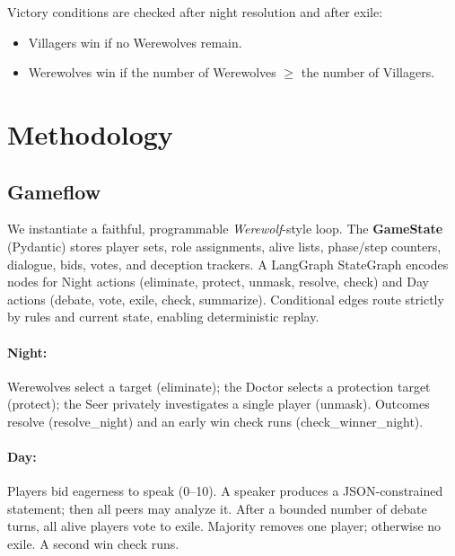 \documentclass[12pt]{article}
\begin{document}
Victory conditions are checked after night resolution and after exile:
\begin{itemize}
  \item Villagers win if no Werewolves remain.
  \item Werewolves win if the number of Werewolves \( \geq \) the number of Villagers.
\end{itemize}

\section{Methodology}

\subsection{Gameflow}
We instantiate a faithful, programmable \textit{Werewolf}-style loop. The \textbf{GameState} (Pydantic) stores player sets, role assignments, alive lists, phase/step counters, dialogue, bids, votes, and deception trackers. A LangGraph StateGraph encodes nodes for Night actions (eliminate, protect, unmask, resolve, check) and Day actions (debate, vote, exile, check, summarize). Conditional edges route strictly by rules and current state, enabling deterministic replay.

\paragraph{Night:} Werewolves select a target (eliminate); the Doctor selects a protection target (protect); the Seer privately investigates a single player (unmask). Outcomes resolve (resolve\_night) and an early win check runs (check\_winner\_night).

\paragraph{Day:} Players bid eagerness to speak (0–10). A speaker produces a JSON-constrained statement; then all peers may analyze it. After a bounded number of debate turns, all alive players vote to exile. Majority removes one player; otherwise no exile. A second win check runs.
\end{document}
